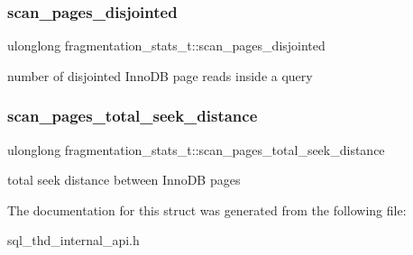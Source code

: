 \subsubsection{\texorpdfstring{scan\+\_\+pages\+\_\+disjointed}{scan\_pages\_disjointed}}
{\footnotesize\ttfamily ulonglong fragmentation\+\_\+stats\+\_\+t\+::scan\+\_\+pages\+\_\+disjointed}

number of disjointed Inno\+DB page reads inside a query \mbox{\label{structfragmentation__stats__t_a6b492cab2ba136ce2633b2178e502f4c}} 
\subsubsection{\texorpdfstring{scan\+\_\+pages\+\_\+total\+\_\+seek\+\_\+distance}{scan\_pages\_total\_seek\_distance}}
{\footnotesize\ttfamily ulonglong fragmentation\+\_\+stats\+\_\+t\+::scan\+\_\+pages\+\_\+total\+\_\+seek\+\_\+distance}

total seek distance between Inno\+DB pages 

The documentation for this struct was generated from the following file\+:\begin{DoxyCompactItemize}
\item 
sql\+\_\+thd\+\_\+internal\+\_\+api.\+h\end{DoxyCompactItemize}
